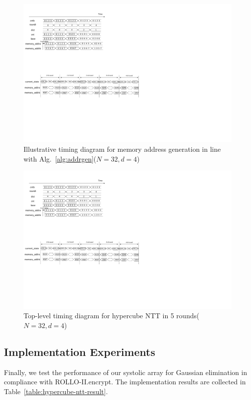 \documentclass[submission]{iacrtrans}
\theoremstyle{plain}
\begin{document}
\begin{figure}[!tb]
\centering
\includegraphics[width=\textwidth]{./fig/timing_diag.pdf}
\caption{Illustrative timing diagram for memory address generation in line with Alg.~\ref{alg:addrgen}($N=32, d=4$)}\label{fig:timing_diag}
\end{figure}

\begin{figure}[!tb]
\centering
\includegraphics[width=\textwidth]{./fig/timing_diag2.pdf}
\caption{Top-level timing diagram for hypercube NTT in 5 rounds($N=32, d=4$)}\label{fig:timing_diag2}
\end{figure}


\subsection{Implementation Experiments}
Finally, we test the performance of our systolic array for Gaussian elimination in compliance with ROLLO-II.encrypt. The implementation results are collected in Table~\ref{table:hypercube-ntt-result}.
 
\end{document}
